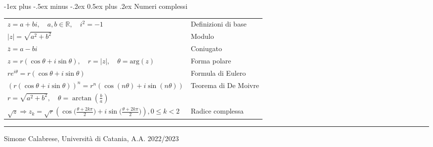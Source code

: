 \documentclass[a4paper,10pt,landscape]{article}
\makeatletter
\renewcommand{\section}{\@startsection{section}{1}{0mm}%
                                {-1ex plus -.5ex minus -.2ex}%
                                {0.5ex plus .2ex}%
                                {\normalfont\large\bfseries}}
\makeatother
\begin{document}
\begin{multicols}{3}
\section{\hspace{.8cm} Numeri complessi} 
\vspace{1mm}
\hspace{.8cm}
\begin{tabular}{l l}
    $ z = a + bi, \quad a, b \in \mathbb{R}, \quad i^2 = -1 $ & Definizioni di base \\
    $ |z| = \sqrt{a^2 + b^2} $ & Modulo \\
    $ \bar{z} = a - bi $ & Coniugato \\
    $ z = r(\cos \theta + i \sin \theta), \quad r = |z|, \quad \theta = \text{arg}(z) $ & Forma polare \\
    $ re^{i\theta} = r(\cos \theta + i \sin \theta) $ &   Formula di Eulero \\
    $ (r(\cos \theta + i \sin \theta))^n = r^n (\cos (n\theta) + i \sin (n\theta))$ & Teorema di De Moivre \\
    $ r = \sqrt{a^2 + b^2}, \quad \theta = \arctan\left(\frac{b}{a}\right) $ \\
    $ \sqrt{z} \Rightarrow z_k = \sqrt{r}(\cos \big(\frac{\theta + 2k\pi}{2}\big) + i \sin \big(\frac{\theta + 2k\pi}{2}\big) ), 0\le k<2  $ & Radice complessa\\
\end{tabular}

\vspace{4mm}

\vfill
\hrule
\smallskip

\noindent Simone Calabrese, Università di Catania, A.A. 2022/2023 \hfill  \href{http://simonecalabrese.com/}{\color{blue}{simonecalabrese.com}}\\

\end{multicols}
\end{document}
